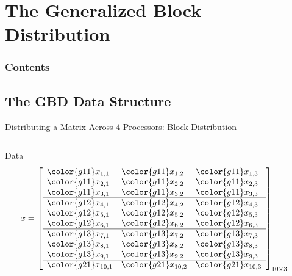 \section[GBD]{The Generalized Block Distribution}

\hidenum
\begin{frame}[noframenumbering]
\frametitle{Contents}
 \tableofcontents[currentsection,hideothersubsections,sectionstyle=show/hide]
\end{frame}
\shownum


\subsection{The GBD Data Structure}


\begin{frame}
\begin{exampleblock}{Distributing a Matrix Across 4 Processors: Block Distribution}
  \begin{columns}[t,onlytextwidth]
    \begin{column}{0.5\textwidth}
      \hfill Data \hfill\ 
      \begin{align*}
      x &= \left[
            \begin{array}{lll}
            \color{g11}x_{1,1} & \color{g11}x_{1,2} & \color{g11}x_{1,3} \\
            \color{g11}x_{2,1} & \color{g11}x_{2,2} & \color{g11}x_{2,3} \\
            \color{g11}x_{3,1} & \color{g11}x_{3,2} & \color{g11}x_{3,3} \\\hline
            \color{g12}x_{4,1} & \color{g12}x_{4,2} & \color{g12}x_{4,3} \\
            \color{g12}x_{5,1} & \color{g12}x_{5,2} & \color{g12}x_{5,3} \\
            \color{g12}x_{6,1} & \color{g12}x_{6,2} & \color{g12}x_{6,3} \\\hline
            \color{g13}x_{7,1} & \color{g13}x_{7,2} & \color{g13}x_{7,3} \\
            \color{g13}x_{8,1} & \color{g13}x_{8,2} & \color{g13}x_{8,3} \\
            \color{g13}x_{9,1} & \color{g13}x_{9,2} & \color{g13}x_{9,3} \\\hline
            \color{g21}x_{10,1} & \color{g21}x_{10,2} & \color{g21}x_{10,3} \\
            \end{array}
      \right]_{10\times 3}

\end{align*}
\end{column}
\end{columns}
\end{exampleblock}
\end{frame}
